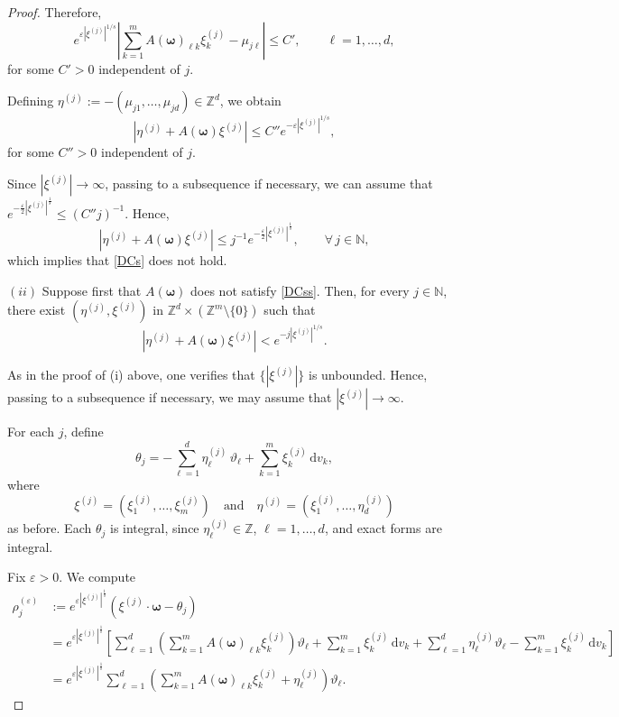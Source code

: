\documentclass[11pt,reqno]{amsart}
\numberwithin{equation}{section}
\begin{document}
\begin{proof}
	Therefore,
	\[
	e^{\varepsilon|\xi^{(j)}|^{1/s}} \left| \sum_{k=1}^{m} A(\boldsymbol{\omega})_{\ell k}\xi^{(j)}_k - \mu_{j\ell} \right| \le C', \qquad \ell=1,\dots,d,
	\]
	for some $C'>0$ independent of $j$.
	
	Defining $\eta^{(j)} := -(\mu_{j1}, \dots, \mu_{jd}) \in \mathbb{Z}^d$, we obtain
	\[
	|\eta^{(j)} + A(\boldsymbol{\omega})\xi^{(j)}| \le C'' e^{-\varepsilon|\xi^{(j)}|^{1/s}},
	\]
	for some $C''>0$ independent of $j$.
	
	Since $|\xi^{(j)}| \to \infty$, passing to a subsequence if necessary, we can assume that $e^{-\frac{\varepsilon}{2}|\xi^{(j)}|^{\frac{1}{s}}} \leq (C''j)^{-1}$. Hence,
	\[
	|\eta^{(j)} + A(\boldsymbol{\omega}) \xi^{(j)}| \leq j^{-1} e^{-\frac{\varepsilon}{2}|\xi^{(j)}|^{\frac{1}{s}}}, \qquad \forall\, j \in \mathbb{N},
	\]
	which implies that \eqref{DCs} does not hold.
	
	\medskip
	
	\noindent
	$(ii)$ Suppose first that $A(\boldsymbol{\omega})$ does not satisfy \eqref{DCss}. 
	Then, for every $j\in\mathbb{N}$, there exist  	$(\eta^{(j)},\xi^{(j)})$ in $\mathbb{Z}^d \times (\mathbb{Z}^m\setminus\{0\})$ such that
	\begin{equation}\label{not_DC_b}
		|\eta^{(j)} + A(\boldsymbol{\omega})\xi^{(j)}| 	< e^{-j|\xi^{(j)}|^{1/s}}.
	\end{equation}
	
	As in the proof of (i) above, one verifies that $\{|\xi^{(j)}|\}$ is unbounded. Hence, passing to a subsequence if necessary, we may assume that $|\xi^{(j)}|\to\infty$.
	
	For each $j$, define
	\begin{equation*}
		\theta_j = -\sum_{\ell=1}^d \eta^{(j)}_\ell\,\vartheta_\ell + \sum_{k=1}^m \xi^{(j)}_k\,\mathrm{d}v_k,
	\end{equation*}
	where
	\[\xi^{(j)}=(\xi^{(j)}_1,\dots,\xi^{(j)}_m)\quad\text{and}\quad \eta^{(j)}=(\xi^{(j)}_1,\dots,\eta^{(j)}_d)\]
	as before.	
	Each $\theta_j$ is integral, since $\eta^{(j)}_\ell\in\mathbb{Z}$, $\ell=1,\dots,d$, and exact forms are integral.
	
	
	Fix $\varepsilon>0$. We compute
	\begin{align*}
		\rho_j^{(\varepsilon)} 
		&:= e^{\varepsilon|\xi^{(j)}|^{\frac{1}{s}}} (\xi^{(j)} \cdot \boldsymbol{\omega} - \theta_j) \\
		&=
		e^{\varepsilon|\xi^{(j)}|^{\frac{1}{s}}} \left[ \sum_{\ell=1}^{d} \left(
		\sum_{k=1}^{m} A(\boldsymbol{\omega})_{\ell k}\xi^{(j)}_k \right)\vartheta_\ell
		+ \sum_{k=1}^{m}\xi^{(j)}_k\,\mathrm{d}v_k + 	\sum_{\ell=1}^{d} \eta^{(j)}_\ell\vartheta_\ell - \sum_{k=1}^{m}\xi^{(j)}_k\,\mathrm{d}v_k \right]\\
		& = e^{\varepsilon|\xi^{(j)}|^{\frac{1}{s}}} \sum_{\ell=1}^{d}
		\left( 	\sum_{k=1}^{m} A(\boldsymbol{\omega})_{\ell k}\xi^{(j)}_k + \eta^{(j)}_\ell
		\right)\vartheta_\ell. 
	\end{align*}
	

\end{proof}
\end{document}
